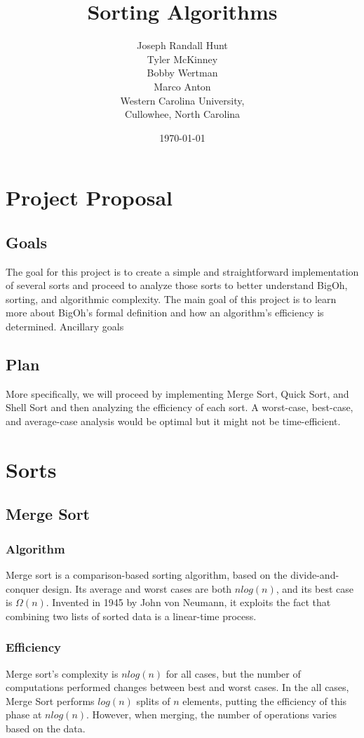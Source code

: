 \documentclass{article}
\title{Sorting Algorithms}
\author{Joseph Randall Hunt\\
Tyler McKinney\\
Bobby Wertman\\
Marco Anton\\
Western Carolina University,\\
Cullowhee, North Carolina\\
}
\date{\today}
\begin{document}
\maketitle
\section{Project Proposal}
   \subsection{Goals}
    The goal for this project is to create a simple and straightforward
implementation of several sorts and proceed to analyze those sorts to better
understand BigOh, sorting, and algorithmic complexity. The main goal of this
project is to learn more about BigOh's formal definition and how an
algorithm's efficiency is determined. Ancillary goals
   \subsection{Plan}
    More specifically, we will proceed by implementing Merge Sort, Quick Sort,
    and Shell Sort and then analyzing the efficiency of each sort. A worst-case, 
    best-case, and average-case analysis would be optimal but it might not be
    time-efficient.
\section{Sorts}
   \subsection{Merge Sort}
      \subsubsection{Algorithm}
        Merge sort is a comparison-based sorting algorithm, based on the
divide-and-conquer design. Its average and worst cases are both $n log(n)$,
and its best case is $\Omega(n)$. Invented in 1945 by John von Neumann, it
exploits the fact that combining two lists of sorted data is a linear-time
process. \cite{introalg} \subsubsection{Efficiency} Merge sort's complexity is
$n log(n)$ for all cases, but the number of computations performed changes
between best and worst cases. In the all cases, Merge Sort performs $log(n)$
splits of $n$ elements, putting the efficiency of this phase at $n log(n)$.
However, when merging, the number of operations varies based on the data.
\end{document}
